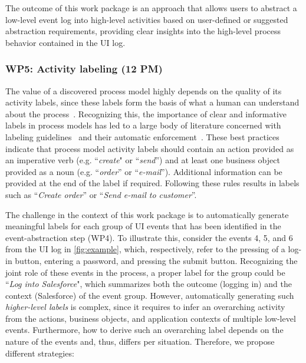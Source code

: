  The outcome of this work package is an approach that allows users to abstract a low-level event log into high-level activities based on user-defined or suggested abstraction requirements, providing clear insights into the high-level process behavior contained in the UI log.

\newpage 
\subsubsection{WP5: Activity labeling (12 PM)}
\label{sec:wp5}

The value of a discovered process model highly depends on the quality of its activity labels, since these labels form the basis of what a human can understand about the process~\cite{mendling2010activity}. Recognizing this,  the importance of clear and informative labels in process models has led to a large body of literature concerned with labeling guidelines~\cite{mendling2010seven,leopold2015learning} and their automatic enforcement~\cite{leopold2013detection,becker2009towards}. 
These best practices indicate that process model activity labels should contain an action provided as an imperative verb (e.g. ``\textit{create}" or ``\textit{send}'') and at least one business object provided as a noun (e.g. ``\textit{order}'' or ``\textit{e-mail}''). Additional information can be provided at the end of the label if required. Following these rules results in labels such as ``\textit{Create order}'' or ``\textit{Send e-mail to customer}''. 

The challenge in the context of this work package is to automatically generate meaningful labels for each group of UI events that has been identified in the event-abstraction step (WP4). To illustrate this, consider the events 4, 5, and 6 from the UI log in \autoref{fig:example}, which, respectively, refer to the pressing of a log-in button, entering a password, and pressing the submit button.
Recognizing the joint role of these events in the process, a proper label for the group could be ``\textit{Log into Salesforce}", which summarizes both the outcome (logging in) and the context (Salesforce) of the event group. 
However, automatically generating such \textit{higher-level labels} is complex, since it requires to infer an overarching activity from the actions, business objects, and application contexts of multiple low-level events. Furthermore, how to derive such an overarching label depends on the nature of the events and, thus, differs per situation. Therefore, we propose different strategies:

